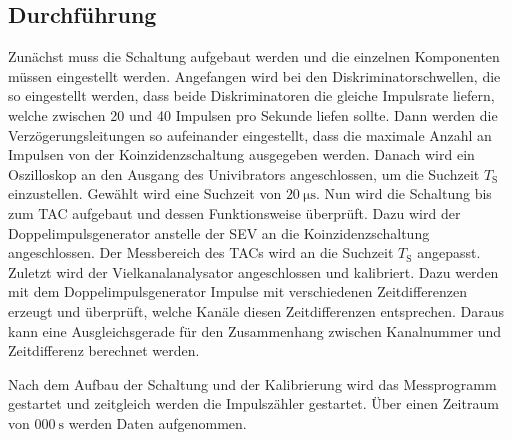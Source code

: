 \subsection{Durchführung}
Zunächst muss die Schaltung aufgebaut werden und die einzelnen Komponenten müssen eingestellt werden. Angefangen wird bei den Diskriminatorschwellen, die so eingestellt werden, dass
beide Diskriminatoren die gleiche Impulsrate liefern, welche zwischen 20 und 40 Impulsen pro Sekunde liefen sollte. Dann werden die Verzögerungsleitungen so aufeinander eingestellt, dass
die maximale Anzahl an Impulsen von der Koinzidenzschaltung ausgegeben werden. Danach wird ein Oszilloskop an den Ausgang des Univibrators angeschlossen, um die Suchzeit $T_\text{S}$ einzustellen.
Gewählt wird eine Suchzeit von $\SI{20}{\micro\second}$. Nun wird die Schaltung bis zum TAC aufgebaut und dessen Funktionsweise überprüft. Dazu wird der Doppelimpulsgenerator anstelle der SEV an die
Koinzidenzschaltung angeschlossen. Der Messbereich des TACs wird an die Suchzeit $T_\text{S}$ angepasst. Zuletzt wird der Vielkanalanalysator angeschlossen und kalibriert. Dazu werden mit dem Doppelimpulsgenerator
Impulse mit verschiedenen Zeitdifferenzen erzeugt und überprüft, welche Kanäle diesen Zeitdifferenzen entsprechen. Daraus kann eine Ausgleichsgerade für den Zusammenhang zwischen Kanalnummer und Zeitdifferenz berechnet
werden.

Nach dem Aufbau der Schaltung und der Kalibrierung wird das Messprogramm gestartet und zeitgleich werden die Impulszähler gestartet. Über einen Zeitraum von $\SI{000}{\second}$ werden Daten aufgenommen.
